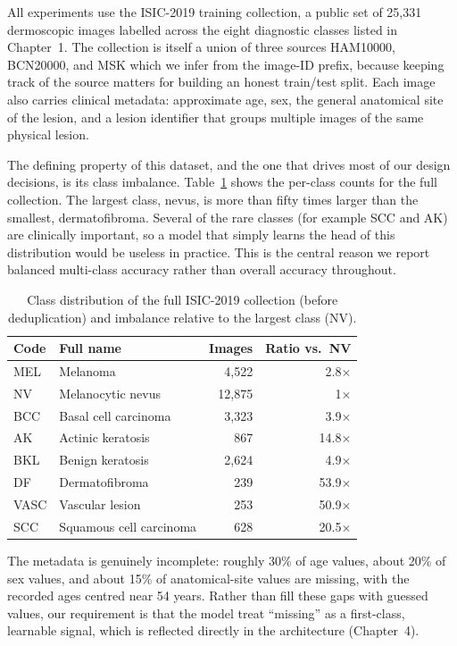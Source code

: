 All experiments use the ISIC-2019 training collection, a public set of 25{,}331
dermoscopic images labelled across the eight diagnostic classes listed in
Chapter~1. The collection is itself a union of three sources HAM10000,
BCN20000, and MSK which we infer from the image-ID prefix, because keeping
track of the source matters for building an honest train/test split. Each image
also carries clinical metadata: approximate age, sex, the general anatomical
site of the lesion, and a lesion identifier that groups multiple images of the
same physical lesion.

The defining property of this dataset, and the one that drives most of our
design decisions, is its class imbalance. Table~\ref{tab:classdist} shows the
per-class counts for the full collection. The largest class, nevus, is more than
fifty times larger than the smallest, dermatofibroma. Several of the rare
classes (for example SCC and AK) are clinically important, so a model that
simply learns the head of this distribution would be useless in practice. This
is the central reason we report balanced multi-class accuracy rather than overall
accuracy throughout.

\begin{table}[!t]
\centering
\caption{Class distribution of the full ISIC-2019 collection (before
deduplication) and imbalance relative to the largest class (NV).}
\label{tab:classdist}
\begin{tabular}{llrr}
\toprule
Code & Full name & Images & Ratio vs.\ NV \\
\midrule
MEL  & Melanoma                  & 4{,}522  & 2.8$\times$  \\
NV   & Melanocytic nevus         & 12{,}875 & 1$\times$    \\
BCC  & Basal cell carcinoma      & 3{,}323  & 3.9$\times$  \\
AK   & Actinic keratosis         & 867      & 14.8$\times$ \\
BKL  & Benign keratosis          & 2{,}624  & 4.9$\times$  \\
DF   & Dermatofibroma            & 239      & 53.9$\times$ \\
VASC & Vascular lesion           & 253      & 50.9$\times$ \\
SCC  & Squamous cell carcinoma   & 628      & 20.5$\times$ \\
\bottomrule
\end{tabular}
\end{table}

The metadata is genuinely incomplete: roughly 30\% of age values, about 20\% of
sex values, and about 15\% of anatomical-site values are missing, with the
recorded ages centred near 54 years. Rather than fill these gaps with guessed
values, our requirement is that the model treat ``missing'' as a first-class,
learnable signal, which is reflected directly in the architecture (Chapter~4).
